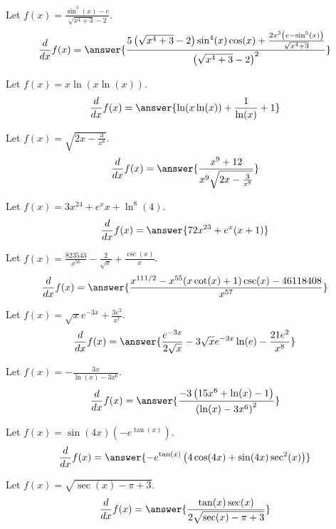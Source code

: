 \documentclass{ximera}
\begin{document}
\begin{shuffle}
\begin{exercise}
Let $f(x)=\frac{\sin ^5(x)-e}{\sqrt{x^4+3}-2}$.
\[
\ddx f(x) = \answer{\frac{5 \left(\sqrt{x^4+3}-2\right) \sin ^4(x) \cos (x)+\frac{2 x^3 \left(e-\sin ^5(x)\right)}{\sqrt{x^4+3}}}{\left(\sqrt{x^4+3}-2\right)^2}}
\]
\end{exercise}

\begin{exercise}
Let $f(x)=x \ln (x \ln (x))$.
\[
\ddx f(x) = \answer{\ln (x \ln (x))+\frac{1}{\ln (x)}+1}
\]
\end{exercise}

\begin{exercise}
Let $f(x)=\sqrt{2 x-\frac{3}{x^8}}$.
\[
\ddx f(x) = \answer{\frac{x^9+12}{x^9 \sqrt{2 x-\frac{3}{x^8}}}}
\]
\end{exercise}

\begin{exercise}
Let $f(x)=3 x^{24}+e^x x+\ln ^8(4)$.
\[
\ddx f(x) = \answer{72 x^{23}+e^x (x+1)}
\]
\end{exercise}

\begin{exercise}
Let $f(x)=\frac{823543}{x^{56}}-\frac{2}{\sqrt{x}}+\frac{\csc (x)}{x}$.
\[
\ddx f(x) = \answer{\frac{x^{111/2}-x^{55} (x \cot (x)+1) \csc (x)-46118408}{x^{57}}}
\]
\end{exercise}

\begin{exercise}
Let $f(x)=\sqrt{x} e^{-3 x}+\frac{3 e^2}{x^7}$.
\[
\ddx f(x) = \answer{\frac{e^{-3 x}}{2 \sqrt{x}}-3 \sqrt{x} e^{-3 x} \ln (e)-\frac{21 e^2}{x^8}}
\]
\end{exercise}

\begin{exercise}
Let $f(x)=-\frac{3 x}{\ln (x)-3 x^6}$.
\[
\ddx f(x) = \answer{\frac{-3 \left(15 x^6+\ln (x)-1\right)}{\left(\ln (x)-3 x^6\right)^2}}
\]
\end{exercise}

\begin{exercise}
Let $f(x)=\sin (4 x) \left(-e^{\tan (x)}\right)$.
\[
\ddx f(x) = \answer{-e^{\tan (x)} \left(4 \cos (4 x)+\sin (4 x) \sec ^2(x)\right)}
\]
\end{exercise}

\begin{exercise}
Let $f(x)=\sqrt{\sec (x)-\pi +3}$.
\[
\ddx f(x) = \answer{\frac{\tan (x) \sec (x)}{2 \sqrt{\sec (x)-\pi +3}}}
\]
\end{exercise}


\end{shuffle}
\end{document}
